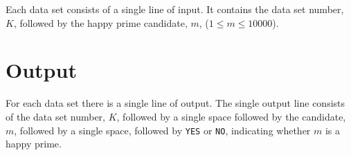Each data set consists of a single line of input.  It contains the data set number, $K$, 
followed by the happy prime candidate, $m$, ($1 \le m \le 10000$).

\section*{Output}

For each data set there is a single line of output.  The single output
line consists of the data set number, $K$, followed by a single space
followed by the candidate, $m$, followed by a single space, followed by
\texttt{YES} or \texttt{NO}, indicating whether $m$ is a happy prime.


